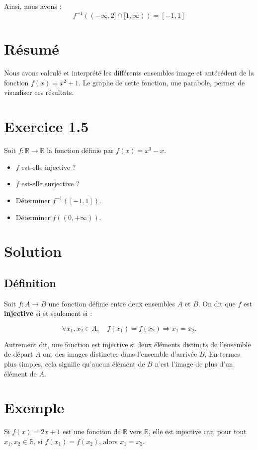 \documentclass[a4paper,oneside,12pt]{amsbook}
\theoremstyle{definition}
\theoremstyle{remark}
\begin{document}
Ainsi, nous avons :
\[
f^{-1}((-\infty, 2] \cap [1, \infty)) = [-1, 1]
\]

\section*{Résumé}

Nous avons calculé et interprété les différents ensembles image et antécédent de la fonction \( f(x) = x^2 + 1 \). Le graphe de cette fonction, une parabole, permet de visualiser ces résultats.

\section*{Exercice 1.5}

Soit $f : \mathbb{R} \to \mathbb{R}$ la fonction définie par $f(x) = x^3 - x$. 
\begin{itemize}
    \item $f$ est-elle injective ?
    \item $f$ est-elle surjective ?
    \item Déterminer $f^{-1}([-1,1])$.
    \item Déterminer $f((0, +\infty))$.
\end{itemize}

\section*{Solution}

\subsection*{Définition}

Soit $f : A \to B$ une fonction définie entre deux ensembles $A$ et $B$. On dit que $f$ est \textbf{injective} si et seulement si :

\[
\forall x_1, x_2 \in A, \quad f(x_1) = f(x_2) \Rightarrow x_1 = x_2.
\]

Autrement dit, une fonction est injective si deux éléments distincts de l'ensemble de départ $A$ ont des images distinctes dans l'ensemble d'arrivée $B$. En termes plus simples, cela signifie qu'aucun élément de $B$ n'est l'image de plus d'un élément de $A$.

\section*{Exemple}

Si $f(x) = 2x + 1$ est une fonction de $\mathbb{R}$ vers $\mathbb{R}$, elle est injective car, pour tout $x_1, x_2 \in \mathbb{R}$, si $f(x_1) = f(x_2)$, alors $x_1 = x_2$.
\end{document}

